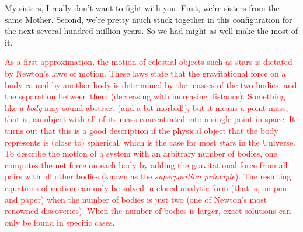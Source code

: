 \documentclass[main.tex]{subfiles}
\begin{document}
\par \Celaeno My sisters, I really don't want to fight with you.  First, we're sisters from the same Mother.  Second, we're pretty much stuck together in this configuration for the next several hundred million years.  So we had might as well make the most of it.

\begin{tcolorbox}[sharp corners, colback=red!30, colframe=red!80!blue, title=Orbital Dynamics Ia]
\par \textcolor{red}{As a first approximation, the motion of celestial objects such as stars is dictated by Newton's laws of motion. These laws state that the gravitational force on a body caused by another body is determined by the masses of the two bodies, and the separation between them (decreasing with increasing distance). Something like a {\it body} may sound abstract (and a bit morbid!), but it means a point mass, that is, an object with all of its mass concentrated into a single point in space. It turns out that this is a good description if the physical object that the body represents is (close to) spherical, which is the case for most stars in the Universe. \\
To describe the motion of a system with an arbitrary number of bodies, one computes the net force on each body by adding the gravitational force from all pairs with all other bodies (known as the {\it superposition principle}). The resulting equations of motion can only be solved in closed analytic form (that is, on pen and paper) when the number of bodies is just two (one of Newton's most renowned discoveries). When the number of bodies is larger, exact solutions can only be found in specific cases. 
}
\end{tcolorbox}
\end{document}
